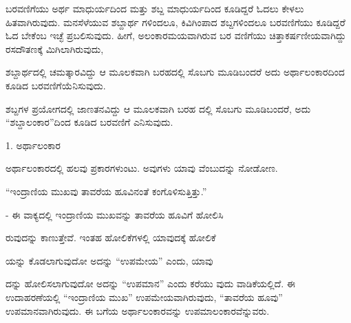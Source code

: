 
\indent ಬರವಣಿಗೆಯು ಅರ್ಥ ಮಾಧುರ್ಯದಿಂದ ಮತ್ತು ಶಬ್ದ ಮಾಧುರ್ಯದಿಂದ ಕೂಡಿದ್ದರೆ ಓದಲು ಕೇಳಲು ಹಿತವಾಗಿರುವುದು. ಮನಸೆಳೆಯುವ ಶಬ್ದಾರ್ಥ ಗಳಿಂದಲೂ, ಕಿವಿಗಿಂಪಾದ ಶಬ್ದಗಳಿಂದಲೂ ಬರವಣಿಗೆಯು ಕೂಡಿದ್ದರೆ ಓದ ಬೇಕೆಂಬ ಇಚ್ಛೆ ಪ್ರಬಲಿಸುವುದು. ಹೀಗೆ, ಅಲಂಕಾರಮಯವಾಗಿರುವ ಬರ ವಣಿಗೆಯು ಚಿತ್ತಾಕರ್ಷಣೀಯವಾಗಿದ್ದು ರಸದೌತಣಕ್ಕೆ ಮಿಗಿಲಾಗಿರುವುದು,\par

\indent ಶಬ್ದಾರ್ಥದಲ್ಲಿ ಚಮತ್ಕಾರವಿದ್ದು ಆ ಮೂಲಕವಾಗಿ ಬರಹದಲ್ಲಿ ಸೊಬಗು ಮೂಡಿಬಂದರೆ ಅದು ಅರ್ಥಾಲಂಕಾರದಿಂದ ಕೂಡಿದ ಬರವಣಿಗೆಯೆನಿಸುವುದು.\par

\indent ಶಬ್ದಗಳ ಪ್ರಯೋಗದಲ್ಲಿ ಜಾಣತನವಿದ್ದು ಆ ಮೂಲಕವಾಗಿ ಬರಹ ದಲ್ಲಿ ಸೊಬಗು ಮೂಡಿಬಂದರೆ, ಅದು “ಶಬ್ದಾಲಂಕಾರ”ದಿಂದ ಕೂಡಿದ ಬರವಣಿಗೆ ಎನಿಸುವುದು.\par

\vspace{7pt plus 6pt minus 1pt}\begin{center}{\kbvsecfont\fontsize{13pt}{16.5pt}\selectfont\color{kbvaccentdark} 1. ಅರ್ಥಾಲಂಕಾರ}\end{center}\vspace{3pt plus 3pt minus 1pt}

\indent ಅರ್ಥಾಲಂಕಾರದಲ್ಲಿ ಹಲವು ಪ್ರಕಾರಗಳುಂಟು. ಅವುಗಳು ಯಾವು ವೆಂಬುದನ್ನು ನೋಡೋಣ.\par


\indent “ಇಂದ್ರಾಣಿಯ ಮುಖವು ತಾವರೆಯ ಹೂವಿನಂತೆ ಕಂಗೊಳಿಸುತ್ತಿತ್ತು.”\par

\noindent\hfill{\fontsize{9.5pt}{12.5pt}\selectfont\color{kbvgrey}- ಈ ವಾಕ್ಯದಲ್ಲಿ ಇಂದ್ರಾಣಿಯ ಮುಖವನ್ನು ತಾವರೆಯ ಹೂವಿಗೆ ಹೋಲಿಸಿ}\par\vspace{3pt plus 2pt}

\indent ರುವುದನ್ನು ಕಾಣುತ್ತೇವೆ. ಇಂತಹ ಹೋಲಿಕೆಗಳಲ್ಲಿ ಯಾವುದಕ್ಕೆ ಹೋಲಿಕೆ\par

\indent ಯನ್ನು ಕೊಡಲಾಗುವುದೋ ಅದನ್ನು “ಉಪಮೇಯ” ಎಂದು, ಯಾವು\par

\indent ದನ್ನು ಹೋಲಿಸಲಾಗುವುದೋ ಅದನ್ನು “ಉಪಮಾನ” ಎಂದು ಕರೆಯು ವುದು ವಾಡಿಕೆಯಲ್ಲಿದೆ. ಈ ಉದಾಹರಣೆಯಲ್ಲಿ “ಇಂದ್ರಾಣಿಯ ಮುಖ” ಉಪಮೇಯವಾಗಿರುವುದು, “ತಾವರೆಯ ಹೂವು” ಉಪಮಾನವಾಗಿರುವುದು. ಈ ಬಗೆಯ ಅರ್ಥಾಲಂಕಾರವನ್ನು ಉಪಮಾಲಂಕಾರವೆನ್ನುವರು.\par
